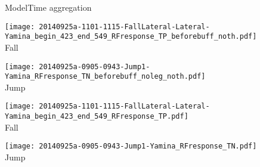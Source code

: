 \begin{frame}{Model}{Time aggregation}

\centering
\begin{minipage}[t]{0.7\linewidth}
    \centering
    \vspace{0pt}
    \renewcommand{\ratio}{1.0}
    \begin{overprint}
        \centering
        \begin{minipage}[t]{0.49\linewidth}
        \centering
        \texttt{[image: 20140925a-1101-1115-FallLateral-Lateral-Yamina\_begin\_423\_end\_549\_RFresponse\_TP\_beforebuff\_noth.pdf]}\\
            {\small Fall}
        \end{minipage}
        \begin{minipage}[t]{0.49\linewidth}
        \centering
        \texttt{[image: 20140925a-0905-0943-Jump1-Yamina\_RFresponse\_TN\_beforebuff\_noleg\_noth.pdf]}\\
            {\small Jump}
        \end{minipage}
        \centering
        \begin{minipage}[t]{0.49\linewidth}
        \centering
        \texttt{[image: 20140925a-1101-1115-FallLateral-Lateral-Yamina\_begin\_423\_end\_549\_RFresponse\_TP.pdf]}\\
            {\small Fall}
        \end{minipage}
        \begin{minipage}[t]{0.49\linewidth}
        \centering
        \texttt{[image: 20140925a-0905-0943-Jump1-Yamina\_RFresponse\_TN.pdf]}\\
            {\small Jump}
        \end{minipage}
    \end{overprint}
    


\end{minipage}
\end{frame}
